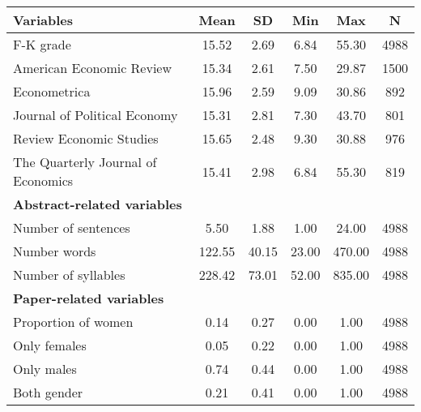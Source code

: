 \begin{tabular}{lccccc}
\toprule
                                     Variables &   Mean &    SD &   Min &    Max &    N \\
\midrule
                                     F-K grade &  15.52 &  2.69 &  6.84 &  55.30 & 4988 \\
          \hspace{3mm}American Economic Review &  15.34 &  2.61 &  7.50 &  29.87 & 1500 \\
                      \hspace{3mm}Econometrica &  15.96 &  2.59 &  9.09 &  30.86 &  892 \\
      \hspace{3mm}Journal of Political Economy &  15.31 &  2.81 &  7.30 &  43.70 &  801 \\
           \hspace{3mm}Review Economic Studies &  15.65 &  2.48 &  9.30 &  30.88 &  976 \\
\hspace{3mm}The Quarterly Journal of Economics &  15.41 &  2.98 &  6.84 &  55.30 &  819 \\
           \textbf{Abstract-related variables} &        &       &       &        &      \\
               \hspace{3mm}Number of sentences &   5.50 &  1.88 &  1.00 &  24.00 & 4988 \\
                      \hspace{3mm}Number words & 122.55 & 40.15 & 23.00 & 470.00 & 4988 \\
               \hspace{3mm}Number of syllables & 228.42 & 73.01 & 52.00 & 835.00 & 4988 \\
              \textbf{Paper-related variables} &        &       &       &        &      \\
               \hspace{3mm}Proportion of women &   0.14 &  0.27 &  0.00 &   1.00 & 4988 \\
                      \hspace{3mm}Only females &   0.05 &  0.22 &  0.00 &   1.00 & 4988 \\
                        \hspace{3mm}Only males &   0.74 &  0.44 &  0.00 &   1.00 & 4988 \\
                       \hspace{3mm}Both gender &   0.21 &  0.41 &  0.00 &   1.00 & 4988 \\

\end{tabular}
